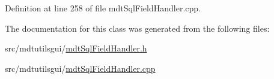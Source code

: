 Definition at line 258 of file mdt\-Sql\-Field\-Handler.\-cpp.



The documentation for this class was generated from the following files\-:\begin{DoxyCompactItemize}
\item 
src/mdtutilsgui/\hyperlink{mdt_sql_field_handler_8h}{mdt\-Sql\-Field\-Handler.\-h}\item 
src/mdtutilsgui/\hyperlink{mdt_sql_field_handler_8cpp}{mdt\-Sql\-Field\-Handler.\-cpp}\end{DoxyCompactItemize}
